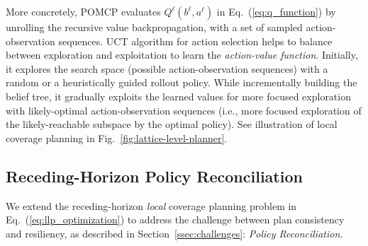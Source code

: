 \documentclass[letterpaper]{article} %
\newcommand{\phdone}[1]{} %
\begin{document}
\phdone{POMCP Details}
More concretely, POMCP evaluates $Q^\ell(b^\ell, a^\ell)$ in Eq.~(\ref{eq:q_function}) by unrolling the recursive value backpropagation, with a set of sampled action-observation sequences.
UCT algorithm for action selection helps to balance between exploration and exploitation to learn the \textit{action-value function}.
Initially, it explores the search space (possible action-observation sequences) with a random or a heuristically guided rollout policy.
While incrementally building the belief tree, it gradually exploits the learned values for more focused exploration with likely-optimal action-observation sequences (i.e., more focused exploration of the likely-reachable subspace by the optimal policy).
See illustration of local coverage planning in Fig.~\ref{fig:lattice-level-planner}.




\subsection{Receding-Horizon Policy Reconciliation} \label{ssec:resilient_rhp}

\phdone{Consistency and Resiliency}
We extend the receding-horizon \textit{local} coverage planning problem
in Eq.~(\ref{eq:llp_optimization}) to address the challenge between plan consistency and resiliency, as described in Section~\ref{ssec:challenges}:
\textit{Policy Reconciliation}.

\end{document}
